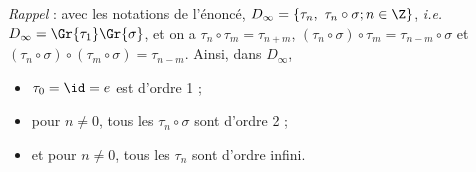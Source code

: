 \emph{Rappel} : avec les notations de l'énoncé, $D_{\infty} = \left\{ \tau_n,~ \tau_n\circ \sigma;n\in \Z\right\}$, \textit{i.e.} $D_{\infty}=\Gr{\tau_1}\Gr{\sigma}$, 
et on a $\tau_n\circ \tau_m = \tau_{n+m}$, $(\tau_n\circ\sigma)\circ \tau_m = \tau_{n-m} \circ \sigma$  et $\left(\tau_n\circ \sigma\right)\circ \left(\tau_m\circ \sigma\right) = \tau_{n-m}$.
Ainsi, dans $D_{\infty}$, 
\begin{itemize}
    \item $\tau_0=\id = e$ est d'ordre 1 ;
    \item pour $n\neq 0$, tous les $\tau_n\circ \sigma$  sont d'ordre 2 ;
    \item et pour $n\neq 0$, tous les $\tau_n$ sont d'ordre infini.
\end{itemize}

